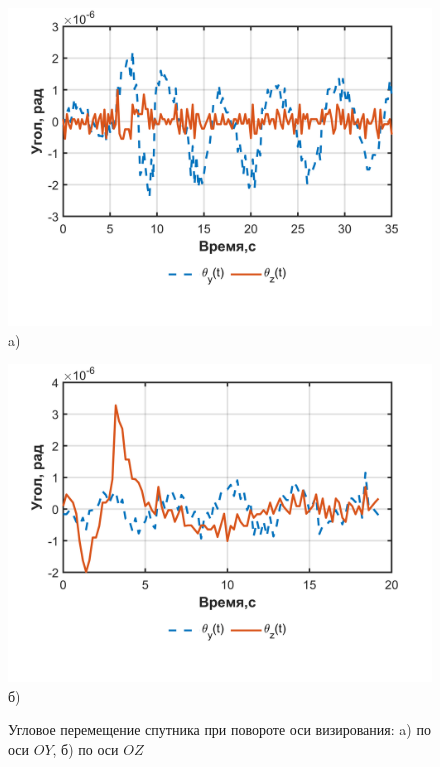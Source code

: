  
 \begin{figure}[!h]
 	\begin{minipage}[b][][b]{0.49\linewidth}\centering
 		\includegraphics[width=1\linewidth]{matlab/img/thetaY.png} \\ a)
 	\end{minipage}
 	\hfill
 	\begin{minipage}[b][][b]{0.49\linewidth}\centering
 		\includegraphics[width=1\linewidth]{matlab/img/thetaZ.png} \\ б)
 	\end{minipage}
 	\caption{Угловое перемещение спутника при повороте оси визирования: a) по оси $OY$, б) по оси $OZ$ }
 	\label{fig:theta}
 \end{figure}
 
